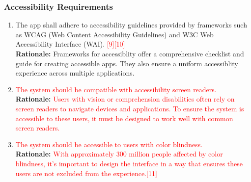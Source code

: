 \documentclass{article}
\begin{document}
\subsubsection{Accessibility Requirements}
\label{ssub:accessibility_requirements}
\begin{enumerate}[{UH-A}1. ]
	\item The app shall adhere to accessibility guidelines provided by frameworks such as WCAG (Web Content Accessibility Guidelines) and W3C Web Accessibility Interface (WAI). \textcolor{red}{[9][10]}\\
	\textbf{Rationale:} Frameworks for accessiblity offer a comprehensive checklist and guide for creating accessible apps. They also ensure a uniform accessiblity experience across multiple applications.
	\item \textcolor{red}{The system should be compatible with accessibility screen readers.}\\
	\textbf{Rationale:} \textcolor{red}{Users with vision or comprehension disabilities often rely on screen readers to navigate devices and applications. To ensure the system is accessible to these users, it must be designed to work well with common screen readers.}\\
	\item \textcolor{red}{The system should be accessible to users with color blindness.}\\
	\textbf{Rationale:} \textcolor{red}{With approximately 300 million people affected by color blindness, it's important to design the interface in a way that ensures these users are not excluded from the experience.[11]}\\
\end{enumerate}
\end{document}
